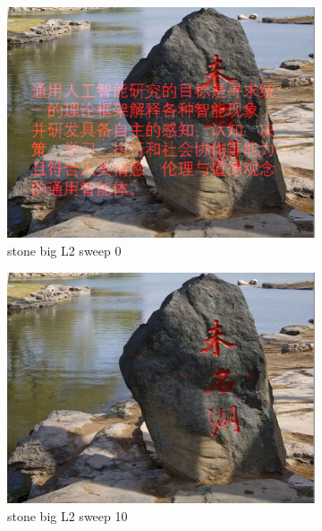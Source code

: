 \documentclass[11pt]{article}
\begin{document}
\begin{figure}[ht!]
    \centering
    \hfill%
    \begin{subfigure}[]{0.333\linewidth}
        \centering
        \includegraphics[width=\linewidth]{fig/restoration/stone_big/L2/gibbs_0.jpg}
        \caption{stone big L2 sweep 0}
    \end{subfigure}%
    \hfill%
    \begin{subfigure}[]{0.333\linewidth}
        \centering
        \includegraphics[width=\linewidth]{fig/restoration/stone_big/L2/gibbs_10.jpg}
        \caption{stone big L2 sweep 10}
    \end{subfigure}%
    \hfill%
    \begin{subfigure}[]{0.333\linewidth}

\end{subfigure}
\end{figure}
\end{document}
